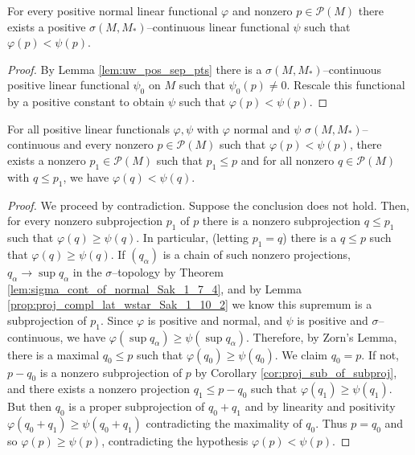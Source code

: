 \begin{lemma}
  \label{lem:exists_uw_ge_normal}
  For every positive normal linear functional $\varphi$ and nonzero $p\in \mathcal{P}(M)$
  there exists a positive $\sigma(M,M_{*})$--continuous linear functional $\psi$ such that $\varphi(p)<\psi(p)$.
\end{lemma}

\begin{proof}
  By Lemma \ref{lem:uw_pos_sep_pts} there is a $\sigma(M,M_{*})$--continuous positive linear
  functional $\psi_0$ on $M$ such that $\psi_0(p)\ne 0$. Rescale this functional by a positive constant to obtain
  $\psi$ such that $\varphi(p)<\psi(p)$.
\end{proof}

\begin{lemma}
  \label{lem:msr_th_lemma}
For all positive linear functionals $\varphi,\psi$ with
$\varphi$ normal and $\psi$ $\sigma(M,M_{*})$--continuous and every nonzero $p\in \mathcal{P}(M)$
such that $\varphi(p)<\psi(p)$, there exists a nonzero $p_1 \in \mathcal{P}(M)$ such that $p_1\le p$ and for all nonzero
$q\in \mathcal{P}(M)$ with $q\le p_1$, we have $\varphi(q)<\psi(q)$.
\end{lemma}

\begin{proof}
  We proceed by contradiction. Suppose the conclusion does not hold. Then, for every nonzero subprojection
  $p_1$ of $p$ there is a nonzero subprojection $q\le p_1$ such that $\varphi(q)\ge \psi(q)$. In particular,
  (letting $p_1=q$) there is a $q\le p$ such that $\varphi(q)\ge \psi(q)$. If $(q_\alpha)$ is a chain
  of such nonzero projections, $q_{\alpha}\to \sup q_{\alpha}$ in the $\sigma$--topology by Theorem \ref{lem:sigma_cont_of_normal_Sak_1_7_4},
  and by Lemma \ref{prop:proj_compl_lat_wstar_Sak_1_10_2} we know this supremum is a subprojection of $p_1$. Since $\varphi$
  is positive and normal, and $\psi$ is positive and $\sigma$--continuous, we have $\varphi(\sup q_{\alpha})\ge \psi(\sup q_{\alpha})$.
  Therefore, by Zorn's Lemma, there is a maximal $q_{0}\le p$ such that $\varphi(q_0)\ge \psi(q_0)$. We claim $q_{0}=p$. If not,
  $p-q_0$ is a nonzero subprojection of $p$ by Corollary \ref{cor:proj_sub_of_subproj}, and there exists a nonzero projection $q_{1}\le p-q_{0}$
  such that $\varphi(q_{1})\ge \psi(q_{1})$. But then $q_{0}$ is a proper subprojection of $q_0+q_1$ and by linearity and positivity
  $\varphi(q_0+q_1)\ge \psi(q_0+q_1)$ contradicting the maximality of $q_0$. Thus $p=q_0$ and so $\varphi(p) \ge \psi(p)$, contradicting
  the hypothesis $\varphi(p)<\psi(p)$.
\end{proof}

